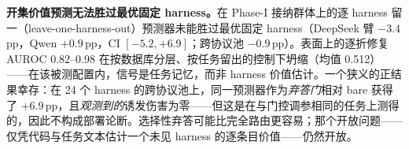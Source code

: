 \textbf{开集价值预测无法胜过最优固定 harness。}在 Phase-I 接纳群体上的逐 harness 留一（leave-one-harness-out）预测器未能胜过最优固定 harness（DeepSeek 臂 $-3.4$\,pp，Qwen $+0.9$\,pp，CI $[-5.2, +6.9]$；跨协议池 $-0.9$\,pp）。表面上的逐折修复 AUROC 0.82--0.98 在按数据库分层、按任务留出的控制下坍缩（均值 0.512）——在该被测配置内，信号是任务记忆，而非 harness 价值估计。一个狭义的正结果幸存：在 24 个 harness 的跨协议池上，同一预测器作为\emph{弃答门}相对 bare 获得了 $+6.9$\,pp，且\emph{观测到的}诱发伤害为零——但这是在与门控调参相同的任务上测得的，因此不构成部署论断。选择性弃答可能比完全路由更容易；那个开放问题——仅凭代码与任务文本估计一个未见 harness 的逐条目价值——仍然开放。
